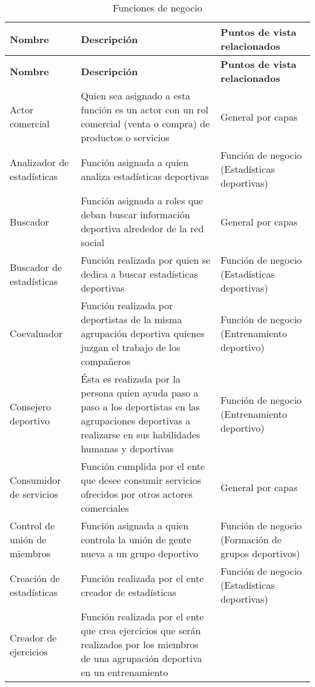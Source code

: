 \begin{center}
	\begin{longtable}{|p{4cm}|p{7cm}|p{4cm}|}
		\caption{Funciones de negocio \label{tab:funciones_negocio}} \\
		\hline
		\textbf{Nombre} &
		\textbf{Descripción} &
		\textbf{Puntos de vista relacionados} \\
		\hline
		\endfirsthead
		\hline
		\textbf{Nombre} &
		\textbf{Descripción} &
		\textbf{Puntos de vista relacionados} \\
		\hline
		\endhead
		\hline
		\endfoot
		\hline
		\endlastfoot
		Actor comercial & 
		Quien sea asignado a esta función es un actor con un rol comercial (venta o compra) de productos o servicios & 
		General por capas
		\\
		\hline
		Analizador de estadísticas & 
		Función asignada a quien analiza estadísticas deportivas & 
		Función de negocio (Estadísticas deportivas)
		\\
		\hline
		Buscador & 
		Función asignada a roles que deban buscar información deportiva alrededor de la red social & 
		General por capas
		\\
		\hline
		Buscador de estadísticas & 
		Función realizada por quien se dedica a buscar estadísticas deportivas & 
		Función de negocio (Estadísticas deportivas)
		\\
		\hline
		Coevaluador & 
		Función realizada por deportistas de la misma agrupación deportiva quienes juzgan el trabajo de los compañeros & 
		Función de negocio (Entrenamiento deportivo)
		\\
		\hline
		Consejero deportivo & 
		Ésta es realizada por la persona quien ayuda paso a paso a los deportistas en las agrupaciones deportivas a realizarse en sus habilidades humanas y deportivas & 
		Función de negocio (Entrenamiento deportivo)
		\\
		\hline
		Consumidor de servicios & 
		Función cumplida por el ente que desee consumir servicios ofrecidos por otros actores comerciales & 
		General por capas
		\\
		\hline
		Control de unión de miembros & 
		Función asignada a quien controla la unión de gente nueva a un grupo deportivo & 
		Función de negocio (Formación de grupos deportivos)
		\\
		\hline
		Creación de estadísticas & 
		Función realizada por el ente creador de estadísticas & 
		Función de negocio (Estadísticas deportivas)
		\\
		\hline
		Creador de ejercicios & 
		Función realizada por el ente que crea ejercicios que serán realizados por los miembros de una agrupación deportiva en un entrenamiento & 

\end{longtable}
\end{center}
